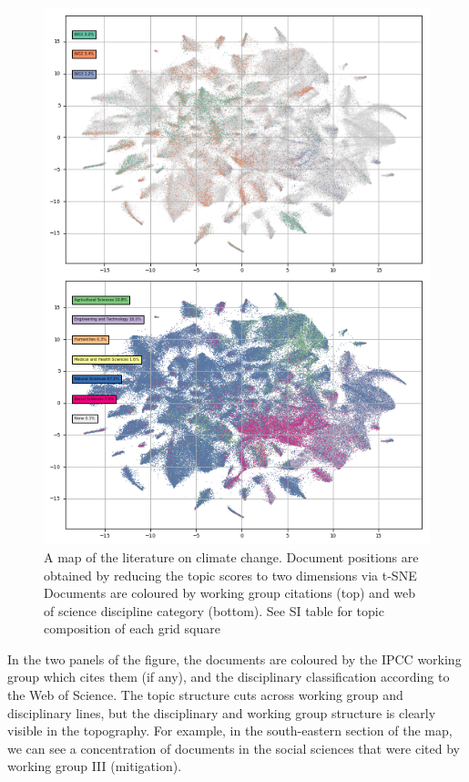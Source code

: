 \documentclass{article}
\begin{document}
\begin{linenumbers}
\begin{figure}
	\begin{center}
		\includegraphics[width=0.85\linewidth]{tsne_results/plots/run_665_s_0_p200_double.png}
		\caption{A map of the literature on climate change. Document positions are obtained by reducing the topic scores to two dimensions via t-SNE Documents are coloured by working group citations (top) and web of science discipline category (bottom). See SI table for topic composition of each grid square}
		\label{map-double}
	\end{center}
\end{figure}


In the two panels of the figure, the documents are coloured by the IPCC working group which cites them (if any), and the disciplinary classification according to the Web of Science. The topic structure cuts across working group and disciplinary lines, but the disciplinary and working group structure is clearly visible in the topography. For example, in the south-eastern section of the map, we can see a concentration of documents in the social sciences that were cited by working group III (mitigation).


\end{linenumbers}
\end{document}
